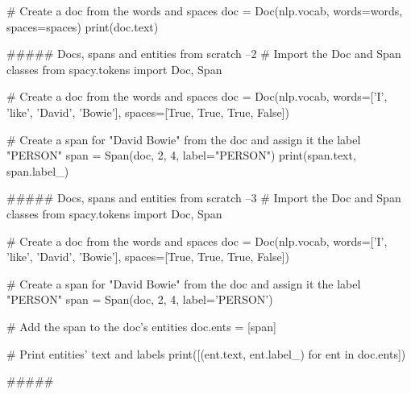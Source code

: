 # Create a doc from the words and spaces
doc = Doc(nlp.vocab, words=words, spaces=spaces)
print(doc.text)



##### Docs, spans and entities from scratch  --2
# Import the Doc and Span classes
from spacy.tokens import Doc, Span

# Create a doc from the words and spaces
doc = Doc(nlp.vocab, words=['I', 'like', 'David', 'Bowie'], spaces=[True, True, True, False])

# Create a span for "David Bowie" from the doc and assign it the label "PERSON"
span = Span(doc, 2, 4, label="PERSON")
print(span.text, span.label_)



##### Docs, spans and entities from scratch  --3
# Import the Doc and Span classes
from spacy.tokens import Doc, Span

# Create a doc from the words and spaces
doc = Doc(nlp.vocab, words=['I', 'like', 'David', 'Bowie'], spaces=[True, True, True, False])

# Create a span for "David Bowie" from the doc and assign it the label "PERSON"
span = Span(doc, 2, 4, label='PERSON')

# Add the span to the doc's entities
doc.ents = [span]

# Print entities' text and labels
print([(ent.text, ent.label_) for ent in doc.ents])



##### 




